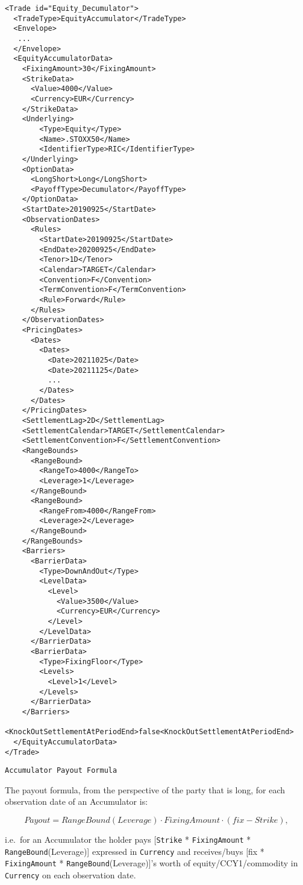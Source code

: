 \begin{verbatim}
<Trade id="Equity_Decumulator">
  <TradeType>EquityAccumulator</TradeType>
  <Envelope>
   ...
  </Envelope>
  <EquityAccumulatorData>
    <FixingAmount>30</FixingAmount>
    <StrikeData>
      <Value>4000</Value>
      <Currency>EUR</Currency>
    </StrikeData>
    <Underlying>
        <Type>Equity</Type>
        <Name>.STOXX50</Name>
        <IdentifierType>RIC</IdentifierType>
    </Underlying>
    <OptionData>
      <LongShort>Long</LongShort>
      <PayoffType>Decumulator</PayoffType>
    </OptionData>
    <StartDate>20190925</StartDate>
    <ObservationDates>
      <Rules>
        <StartDate>20190925</StartDate>
        <EndDate>20200925</EndDate>
        <Tenor>1D</Tenor>
        <Calendar>TARGET</Calendar>
        <Convention>F</Convention>
        <TermConvention>F</TermConvention>
        <Rule>Forward</Rule>
      </Rules>
    </ObservationDates>
    <PricingDates>
      <Dates>
        <Dates>
          <Date>20211025</Date>
          <Date>20211125</Date>
          ...
        </Dates>
      </Dates>
    </PricingDates>
    <SettlementLag>2D</SettlementLag>
    <SettlementCalendar>TARGET</SettlementCalendar>
    <SettlementConvention>F</SettlementConvention>
    <RangeBounds>
      <RangeBound>
        <RangeTo>4000</RangeTo>
        <Leverage>1</Leverage>
      </RangeBound>
      <RangeBound>
        <RangeFrom>4000</RangeFrom>
        <Leverage>2</Leverage>
      </RangeBound>
    </RangeBounds>
    <Barriers>
      <BarrierData>
        <Type>DownAndOut</Type>
        <LevelData>
          <Level>
            <Value>3500</Value>
            <Currency>EUR</Currency>
          </Level>
        </LevelData>
      </BarrierData>
      <BarrierData>
        <Type>FixingFloor</Type>
        <Levels>
          <Level>1</Level>
        </Levels>
      </BarrierData>
    </Barriers>
    <KnockOutSettlementAtPeriodEnd>false<KnockOutSettlementAtPeriodEnd>
  </EquityAccumulatorData>
</Trade>
\end{verbatim}

\lstinline!Accumulator Payout Formula!

The payout formula, from the perspective of the party that is long, for each observation date of an Accumulator is:

$$
Payout = RangeBound(Leverage) \cdot FixingAmount \cdot (fix - Strike),
$$

i.e.\ for an Accumulator the holder pays 
 [\lstinline!Strike! * \lstinline!FixingAmount! * \lstinline!RangeBound!(Leverage)] expressed in \lstinline!Currency! and receives/buys 
 [fix * \lstinline!FixingAmount! * \lstinline!RangeBound!(Leverage)]'s worth of equity/CCY1/commodity in \lstinline!Currency! on each  observation date.

